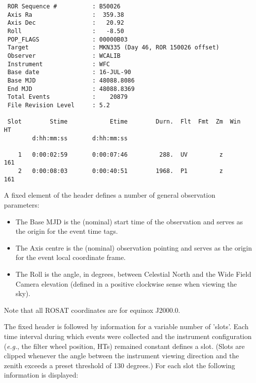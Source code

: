 \begin{verbatim}
 ROR Sequence #          : B50026
 Axis Ra                 :  359.38
 Axis Dec                :   20.92
 Roll                    :   -8.50
 POP_FLAGS               : 00000B03
 Target                  : MKN335 (Day 46, ROR 150026 offset)
 Observer                : WCALIB
 Instrument              : WFC
 Base date               : 16-JUL-90
 Base MJD                : 48088.8086
 End MJD                 : 48088.8369
 Total Events            :    20879
 File Revision Level     : 5.2

 Slot        Stime            Etime        Durn.  Flt  Fmt  Zm  Win   HT
        d:hh:mm:ss       d:hh:mm:ss

    1   0:00:02:59       0:00:07:46         288.  UV         z       161
    2   0:00:08:03       0:00:40:51        1968.  P1         z       161
\end{verbatim}

A fixed element of the header defines a number of general observation
parameters:

\begin{itemize}

\item The Base MJD is the (nominal) start time of the observation and
serves as the origin for the event time tags.

\item The Axis centre is the (nominal) observation pointing and serves
as the origin for the event local coordinate frame.

\item The Roll is the angle, in degrees, between Celestial North and
the Wide Field Camera elevation (defined in a positive clockwise sense
when viewing the sky).

\end{itemize}

Note that all ROSAT coordinates are for equinox J2000.0.

The fixed header is followed by information for a variable number of
'slots'. Each time interval during which events were collected and the
instrument configuration ({\em e.g.}, the filter wheel position, HTs)
remained constant defines a slot. (Slots are clipped whenever the angle
between the instrument viewing direction and the zenith exceeds a
preset threshold of 130 degrees.)  For each slot the following
information is displayed:

